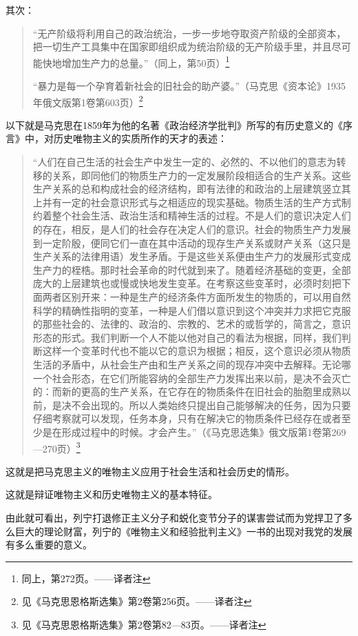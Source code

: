 其次：

\begin{quotation}
“无产阶级将利用自己的政治统治，一步一步地夺取资产阶级的全部资本，把一切生产工具集中在国家即组织成为统治阶级的无产阶级手里，并且尽可能快地增加生产力的总量。”（同上，第50页）\footnote{同上，第272页。——译者注}

“暴力是每一个孕育着新社会的旧社会的助产婆。”（马克思《资本论》1935年俄文版第1卷第603页）\footnote{见《马克思恩格斯选集》第2卷第256页。——译者注}
\end{quotation}

以下就是马克思在1859年为他的名著《政治经济学批判》所写的有历史意义的《序言》中，对历史唯物主义的实质所作的天才的表述：

\begin{quotation}
“人们在自己生活的社会生产中发生一定的、必然的、不以他们的意志为转移的关系，即同他们的物质生产力的一定发展阶段相适合的生产关系。这些生产关系的总和构成社会的经济结构，即有法律的和政治的上层建筑竖立其上并有一定的社会意识形式与之相适应的现实基础。物质生活的生产方式制约着整个社会生活、政治生活和精神生活的过程。不是人们的意识决定人们的存在，相反，是人们的社会存在决定人们的意识。社会的物质生产力发展到一定阶殷，便同它们一直在其中活动的现存生产关系或财产关系（这只是生产关系的法律用语）发生矛盾。于是这些关系便由生产力的发展形式变成生产力的桎梏。那时社会革命的时代就到来了。随着经济基础的变更，全部庞大的上层建筑也或慢或快地发生变革。在考察这些变革时，必须时刻把下面两者区别开来：一种是生产的经济条件方面所发生的物质的，可以用自然科学的精确性指明的变革，一种是人们借以意识到这个冲突并力求把它克服的那些社会的、法律的、政治的、宗教的、艺术的或哲学的，简言之，意识形态的形式。我们判断一个人不能以他对自己的看法为根据，同样，我们判断这样一个变革时代也不能以它的意识为根据；相反，这个意识必须从物质生活的矛盾中，从社会生产由和生产关系之间的现存冲突中去解释。无论哪一个社会形态，在它们所能容纳的全部生产力发挥出来以前，是决不会灭亡的：而新的更高的生产关系，在它存在的物质条件在旧社会的胎胞里成熟以前，是决不会出现的。所以人类始终只提出自己能够解决的任务，因为只要仔细考察就可以发现，任务本身，只有在解决它的物质条件已经存在或者至少是在形成过程中的时候。才会产生。”（《马克思选集》俄文版第1卷第269—270页）\footnote{见《马克思恩格斯选集》第2卷第82—83页。——译者注}
\end{quotation}

这就是把马克思主义的唯物主义应用于社会生活和社会历史的情形。

这就是辩证唯物主义和历史唯物主义的基本特征。

由此就可看出，列宁打退修正主义分子和蜕化变节分子的谋害尝试而为党捍卫了多么巨大的理论财富，列宁的《唯物主义和经验批判主义》一书的出现对我党的发展有多么重要的意义。


